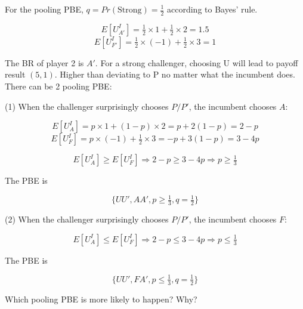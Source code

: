 \documentclass{article}
\begin{document}
For the pooling PBE, $q=Pr(\text{Strong})= \tfrac12$ according to Bayes' rule.

$$E[U^I_{A'}] = \tfrac12 \times 1+ \tfrac12 \times 2 =1.5$$
$$E[U^I_{F'}] = \tfrac12  \times (-1)+ \tfrac12 \times 3 = 1 $$

The BR of player 2 is $A'$. For a strong challenger, choosing U will lead to payoff result $(5,1)$. Higher than deviating to P no matter what the incumbent does. There can be 2 pooling PBE:

\medskip

(1) When the challenger surprisingly chooses $P/P'$, the incumbent chooses $A$:

$$E[U^I_{A}] = p \times 1+ (1-p)\times 2 = p + 2(1-p) = 2 - p$$
$$E[U^I_{F}] = p \times (-1)+ \tfrac12 \times 3 = -p + 3(1-p) = 3 - 4p$$

$$E[U^I_{A}] \ge E[U^I_{F}] \Rightarrow 2-p \ge 3-4p \Rightarrow p \ge \tfrac13$$

The PBE is

$$\{UU',AA',p \ge \tfrac13, q=\tfrac12\}$$

\medskip

(2) When the challenger surprisingly chooses $P/P'$, the incumbent chooses $F$:

$$E[U^I_{A}] \le E[U^I_{F}] \Rightarrow 2-p \le 3-4p \Rightarrow p \le \tfrac13$$

The PBE is

$$\{UU',FA',p \le \tfrac13, q=\tfrac12\}$$

\begin{mdframed}[backgroundcolor=blue!20,linecolor=white]
Which pooling PBE is more likely to happen? Why?
\end{mdframed}
\end{document}
